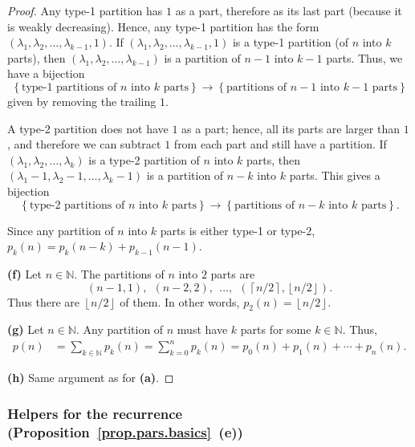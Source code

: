 \begin{proof}
Any type-1 partition has $1$ as a part, therefore as its last part (because it
is weakly decreasing). Hence, any type-1 partition has the form $\left(
\lambda_{1},\lambda_{2},\ldots,\lambda_{k-1},1\right)  $. If $\left(
\lambda_{1},\lambda_{2},\ldots,\lambda_{k-1},1\right)  $ is a type-1 partition
(of $n$ into $k$ parts), then $\left(  \lambda_{1},\lambda_{2},\ldots
,\lambda_{k-1}\right)  $ is a partition of $n-1$ into $k-1$ parts. Thus, we
have a bijection
\[
\left\{  \text{type-1 partitions of }n\text{ into }k\text{ parts}\right\}
\to\left\{  \text{partitions of }n-1\text{ into }k-1\text{ parts}\right\}
\]
given by removing the trailing $1$.

A type-2 partition does not have $1$ as a
part; hence, all its parts are larger than $1$, and therefore we can subtract $1$ from each part and still
have a partition. If $\left(  \lambda
_{1},\lambda_{2},\ldots,\lambda_{k}\right)  $ is a type-2 partition of $n$
into $k$ parts, then $\left(  \lambda_{1}-1,\lambda_{2}-1,\ldots,\lambda_{k}-1\right)  $
is a partition of $n-k$ into $k$ parts. This gives a bijection
\[
\left\{  \text{type-2 partitions of }n\text{ into }k\text{ parts}\right\}
\to\left\{  \text{partitions of }n-k\text{ into }k\text{ parts}\right\}.
\]

Since any partition of $n$ into $k$ parts is either type-1 or type-2,
$p_{k}\left(  n\right)  =p_{k}\left(  n-k\right)  +p_{k-1}\left(  n-1\right)$. \medskip

\textbf{(f)} Let $n\in\mathbb{N}$. The partitions of $n$ into $2$ parts are%
\[
\left(  n-1,1\right)  ,\ \ \left(  n-2,2\right)  ,\ \ \ldots,\ \ \left(
\left\lceil n/2\right\rceil ,\left\lfloor n/2\right\rfloor \right)  .
\]
Thus there are $\left\lfloor n/2\right\rfloor $ of them. In other words,
$p_{2}\left(  n\right)  =\left\lfloor n/2\right\rfloor $. \medskip

\textbf{(g)} Let $n\in\mathbb{N}$. Any partition of $n$ must have $k$ parts
for some $k\in\mathbb{N}$. Thus,%
\begin{align*}
p\left(  n\right)   &  =\sum_{k\in\mathbb{N}}p_{k}\left(  n\right)
=\sum_{k=0}^{n}p_{k}\left(  n\right)
=p_{0}\left(  n\right)  +p_{1}\left(
n\right)  +\cdots+p_{n}\left(  n\right)  .
\end{align*}

\textbf{(h)} Same argument as for \textbf{(a)}.
\end{proof}

\subsubsection{Helpers for the recurrence (Proposition~\ref{prop.pars.basics}~(e))}

